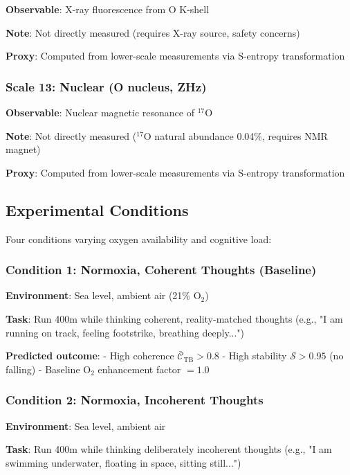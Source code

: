 \documentclass[11pt,onecolumn]{article}
\begin{document}
\textbf{Observable}: X-ray fluorescence from O K-shell

\textbf{Note}: Not directly measured (requires X-ray source, safety concerns)

\textbf{Proxy}: Computed from lower-scale measurements via S-entropy transformation

\subsubsection{Scale 13: Nuclear (O nucleus, ZHz)}

\textbf{Observable}: Nuclear magnetic resonance of $^{17}$O

\textbf{Note}: Not directly measured ($^{17}$O natural abundance 0.04\%, requires NMR magnet)

\textbf{Proxy}: Computed from lower-scale measurements via S-entropy transformation

\subsection{Experimental Conditions}

Four conditions varying oxygen availability and cognitive load:

\subsubsection{Condition 1: Normoxia, Coherent Thoughts (Baseline)}

\textbf{Environment}: Sea level, ambient air (21\% O$_2$)

\textbf{Task}: Run 400m while thinking coherent, reality-matched thoughts (e.g., "I am running on track, feeling footstrike, breathing deeply...")

\textbf{Predicted outcome}:
- High coherence $\bar{\mathcal{C}}_{\text{TB}} > 0.8$
- High stability $\mathcal{S} > 0.95$ (no falling)
- Baseline O$_2$ enhancement factor $= 1.0$

\subsubsection{Condition 2: Normoxia, Incoherent Thoughts}

\textbf{Environment}: Sea level, ambient air

\textbf{Task}: Run 400m while thinking deliberately incoherent thoughts (e.g., "I am swimming underwater, floating in space, sitting still...")
\end{document}

